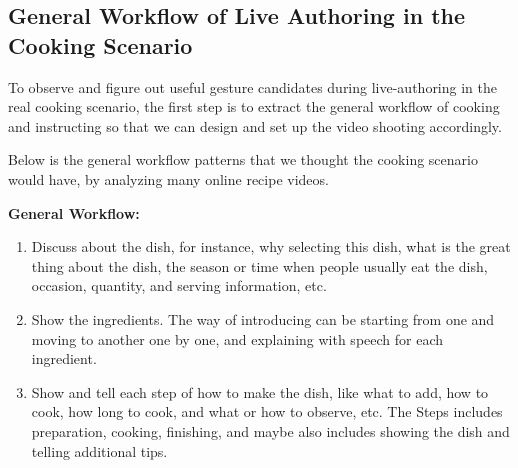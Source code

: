 \documentclass[fyp]{socreport}
\begin{document}
\subsection{General Workflow of Live Authoring in the Cooking Scenario} 
To observe and figure out useful gesture candidates during live-authoring in the real cooking scenario, the first step is to extract the general workflow of cooking and instructing so that we can design and set up the video shooting accordingly.

Below is the general workflow patterns that we thought the cooking scenario would have, by analyzing many online recipe videos.

\textbf{General Workflow:}
\begin{enumerate}
    \item Discuss about the dish, for instance, why selecting this dish, what is the great thing about the dish, the season or time when people usually eat the dish, occasion, quantity, and serving information, etc.
    \item Show the ingredients. The way of introducing can be starting from one and moving to another one by one, and explaining with speech for each ingredient.
    \item Show and tell each step of how to make the dish, like what to add, how to cook, how long to cook, and what or how to observe, etc. The Steps includes preparation, cooking, finishing, and maybe also includes showing the dish and telling additional tips.
\end{enumerate}
\end{document}
